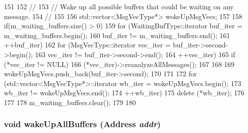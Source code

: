 \begin{DoxyCode}
151 {
152     //
153     // Wake up all possible buffers that could be waiting on any message.
154     //
155 
156     std::vector<MsgVecType*> wokeUpMsgVecs;
157 
158     if(m_waiting_buffers.size() > 0) {
159         for (WaitingBufType::iterator buf_iter = m_waiting_buffers.begin();
160              buf_iter != m_waiting_buffers.end();
161              ++buf_iter) {
162              for (MsgVecType::iterator vec_iter = buf_iter->second->begin();
163                   vec_iter != buf_iter->second->end();
164                   ++vec_iter) {
165                   if (*vec_iter != NULL) {
166                       (*vec_iter)->reanalyzeAllMessages();
167                   }
168              }
169              wokeUpMsgVecs.push_back(buf_iter->second);
170         }
171 
172         for (std::vector<MsgVecType*>::iterator wb_iter = wokeUpMsgVecs.begin();
173              wb_iter != wokeUpMsgVecs.end();
174              ++wb_iter) {
175              delete (*wb_iter);
176         }
177 
178         m_waiting_buffers.clear();
179     }
180 }
\end{DoxyCode}
\hypertarget{classAbstractController_ac01a761bbe6f761c62b6f5ff72ab1c3f}{
\subsubsection[{wakeUpAllBuffers}]{\setlength{\rightskip}{0pt plus 5cm}void wakeUpAllBuffers ({\bf Address} {\em addr})}}
\label{classAbstractController_ac01a761bbe6f761c62b6f5ff72ab1c3f}



